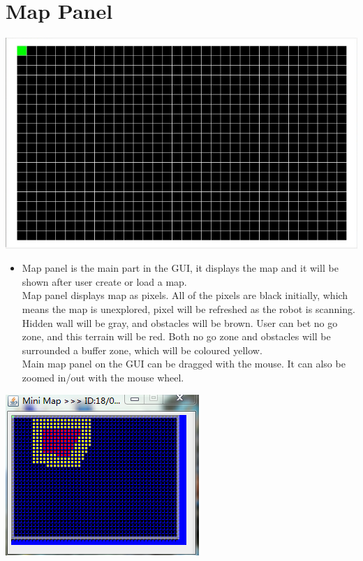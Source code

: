\documentclass[11pt, a4paper]{report}
\begin{document}

\section{Map Panel} %
\label{sec:map_panel}

\begin{center}
\includegraphics[scale=0.388]{./image/MapArea.png}
\end{center}

\begin{itemize}
	\item Map panel is the main part in the GUI, it displays the map and it will be shown after user create or load a map.\\

	Map panel displays map as pixels. All of the pixels are black initially, which means the map is unexplored, pixel will be refreshed as the robot is scanning. Hidden wall will be gray, and obstacles will be brown. User can bet no go zone, and this terrain will be red. Both no go zone and obstacles will be surrounded a buffer zone, which will be coloured yellow.\\

	Main map panel on the GUI can be dragged with the mouse. It can also be zoomed in/out with the mouse wheel.\\ 
	
\end{itemize}

\begin{center}
\includegraphics[scale=0.388]{./image/Mini.png}
\end{center}
\end{document}
